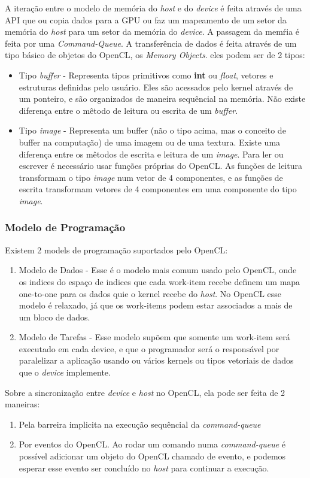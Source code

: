 A iteração entre o modelo de memória do \textit{host} e do \textit{device} é feita através de uma API que ou copia dados para a GPU ou faz um mapeamento de um setor
da memória do \textit{host} para um setor da memória do \textit{device}. A passagem da memŕia é feita por uma \textit{Command-Queue}.
A transferência de dados é feita através de um tipo básico de objetos do OpenCL, os 
\textit{Memory Objects}. eles podem ser de 2 tipos:
\begin{itemize}
  \item Tipo \textit{buffer} - Representa tipos primitivos como \textbf{int} ou \textit{float}, vetores e estruturas definidas pelo usuário. Eles são
    acessados pelo kernel através de um ponteiro, e são organizados de maneira sequêncial na memória. Não existe diferença entre o mêtodo de leitura ou escrita
    de um \textit{buffer}.

  \item Tipo \textit{image} - Representa um buffer (não o tipo acima, mas o conceito de buffer na computação) de uma imagem ou de uma textura. Existe uma diferença entre
    os mêtodos de escrita e leitura de um \textit{image}. Para ler ou escrever é necessário usar funções próprias do OpenCL. As funções de leitura transformam o tipo
    \textit{image} num vetor de 4 componentes, e as funções de escrita transformam vetores de 4 componentes em uma componente do tipo \textit{image}.
\end{itemize}

\subsubsection{Modelo de Programação}

Existem 2 models de programação suportados pelo OpenCL:
\begin{enumerate}
  \item Modelo de Dados - Esse é o modelo mais comum usado pelo OpenCL, onde os indices do espaço de indices que cada work-item recebe 
    definem um mapa one-to-one para os dados quie o kernel recebe do \textit{host}. No OpenCL esse modelo é relaxado, já que os
    work-items podem estar associados a mais de um bloco de dados.
  \item Modelo de Tarefas - Esse modelo supõem que somente um work-item será executado em cada device, e que o programador será o responsável
    por paralelizar a aplicação usando ou vários kernels ou tipos vetoriais de dados que o \textit{device} implemente.
\end{enumerate}

Sobre a sincronização entre \textit{device} e \textit{host} no OpenCL, ela pode ser feita de 2 maneiras:
\begin{enumerate}
  \item Pela barreira implicita na execução sequêncial da \textit{command-queue}
  \item Por eventos do OpenCL. Ao rodar um comando numa \textit{command-queue} é possível adicionar um objeto do OpenCL chamado de evento, e podemos esperar
    esse evento ser concluído no \textit{host} para continuar a execução.
\end{enumerate}
